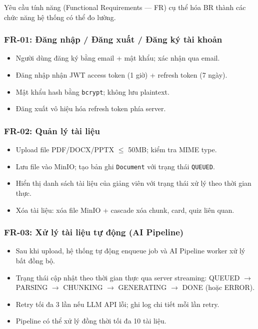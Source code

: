 Yêu cầu tính năng (Functional Requirements --- FR) cụ thể hóa BR thành các
chức năng hệ thống có thể đo lường.

\subsubsection{FR-01: Đăng nhập / Đăng xuất / Đăng ký tài khoản}

\begin{itemize}
    \item Người dùng đăng ký bằng email + mật khẩu; xác nhận qua email.
    \item Đăng nhập nhận JWT access token (1 giờ) + refresh token (7 ngày).
    \item Mật khẩu hash bằng \texttt{bcrypt}; không lưu plaintext.
    \item Đăng xuất vô hiệu hóa refresh token phía server.
\end{itemize}

\subsubsection{FR-02: Quản lý tài liệu}

\begin{itemize}
    \item Upload file PDF/DOCX/PPTX $\leq$ 50MB; kiểm tra MIME type.
    \item Lưu file vào MinIO; tạo bản ghi \texttt{Document} với trạng thái
          \texttt{QUEUED}.
    \item Hiển thị danh sách tài liệu của giảng viên với trạng thái xử lý
          theo thời gian thực.
    \item Xóa tài liệu: xóa file MinIO + cascade xóa chunk, card, quiz liên quan.
\end{itemize}

\subsubsection{FR-03: Xử lý tài liệu tự động (AI Pipeline)}

\begin{itemize}
    \item Sau khi upload, hệ thống tự động enqueue job và AI Pipeline worker
          xử lý bất đồng bộ.
    \item Trạng thái cập nhật theo thời gian thực qua server streaming:
          QUEUED $\to$ PARSING $\to$ CHUNKING $\to$ GENERATING $\to$ DONE
          (hoặc ERROR).
    \item Retry tối đa 3 lần nếu LLM API lỗi; ghi log chi tiết mỗi lần retry.
    \item Pipeline có thể xử lý đồng thời tối đa 10 tài liệu.
\end{itemize}

